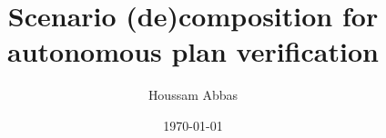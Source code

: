 \documentclass[11pt, oneside, reqno]{article}
\begin{document}
\title{Scenario (de)composition for autonomous plan verification}
\author{Houssam Abbas}
\date{\today}
\maketitle
\tableofcontents





\appendix





\end{document}
